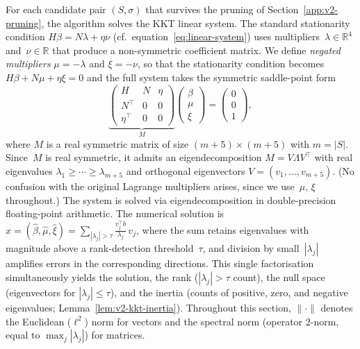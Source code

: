 
For each candidate pair $(S, \sigma)$ that survives
the pruning of Section~\ref{app:v2-pruning},
the algorithm solves the KKT linear system.
The standard stationarity condition
$H\beta = N\lambda + \eta\nu$
(cf.\ equation~\eqref{eq:linear-system})
uses multipliers~$\lambda \in \mathbb{R}^4$ and~$\nu \in \mathbb{R}$
that produce a non-symmetric coefficient matrix.
We define \emph{negated multipliers}
$\mu = -\lambda$ and $\xi = -\nu$, so that
the stationarity condition becomes
$H\beta + N\mu + \eta\xi = 0$
and the full system takes the symmetric saddle-point form
\begin{equation}\label{eq:v2-kkt-system}
  \underbrace{\begin{pmatrix} H & N & \eta \\[3pt]
    N^\top & 0 & 0 \\[3pt]
    \eta^\top & 0 & 0 \end{pmatrix}}_{M}
  \begin{pmatrix} \beta \\ \mu \\ \xi \end{pmatrix}
  = \begin{pmatrix} 0 \\ 0 \\ 1 \end{pmatrix},
\end{equation}
where $M$ is a real symmetric matrix of size
$(m + 5) \times (m + 5)$ with $m = |S|$.
Since~$M$ is real symmetric, it admits an eigendecomposition
$M = V \Lambda V^\top$ with real eigenvalues
$\lambda_1 \geq \cdots \geq \lambda_{m+5}$
and orthogonal eigenvectors $V = (v_1, \ldots, v_{m+5})$.
(No confusion with the original Lagrange multipliers arises,
since we use~$\mu$, $\xi$ throughout.)
The system is solved via eigendecomposition in double-precision
floating-point arithmetic.
The numerical solution is
$\hat x = (\hat\beta, \hat\mu, \hat\xi)
  = \sum_{|\lambda_j| > \tau}
    \frac{v_j^\top b}{\lambda_j}\, v_j$,
where the sum retains eigenvalues with magnitude above a
rank-detection threshold~$\tau$, and division by
small~$|\lambda_j|$ amplifies errors in the corresponding
directions.
This single factorisation simultaneously yields the
solution, the rank ($|\lambda_j| > \tau$ count),
the null space (eigenvectors for $|\lambda_j| \leq \tau$),
and the inertia (counts of positive, zero, and negative
eigenvalues; Lemma~\ref{lem:v2-kkt-inertia}).
Throughout this section, $\|\cdot\|$ denotes the Euclidean
($\ell^2$) norm for vectors and the spectral norm
(operator $2$-norm, equal to $\max_j |\lambda_j|$)
for matrices.

